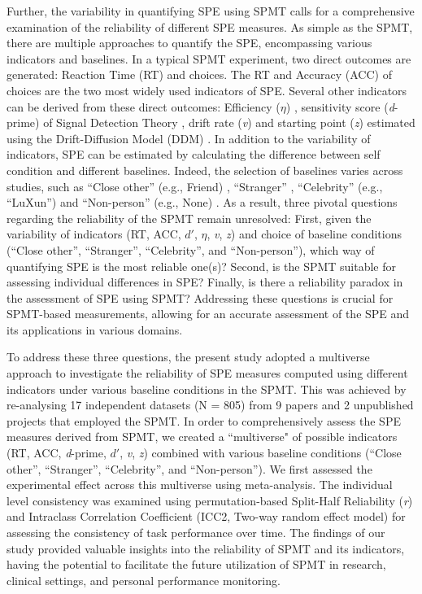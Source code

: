 \documentclass[sn-apa]{sn-jnl}%
\theoremstyle{thmstyleone}%
\theoremstyle{thmstyletwo}%
\theoremstyle{thmstylethree}%
\begin{document}
Further, the variability in quantifying SPE using SPMT calls for a comprehensive examination of the reliability of different SPE measures. As simple as the SPMT, there are multiple approaches to quantify the SPE, encompassing various indicators and baselines. In a typical SPMT experiment, two direct outcomes are generated: Reaction Time (RT) and choices. The RT and Accuracy (ACC) of choices are the two most widely used indicators of SPE. Several other indicators can be derived from these direct outcomes:  Efficiency ($\eta$) \parencite{humphreys2015the,stoeber2008perfectionism}, sensitivity score (\textit{d}-prime) of Signal Detection Theory \parencite{hu2020good,sui2012perceptual}, drift rate (\textit{v}) and starting point (\textit{z}) estimated using the Drift-Diffusion Model (DDM) \parencite{macrae2017self,reuther2017does}.  In addition to the variability of indicators, SPE can be estimated by calculating the difference between self condition and different baselines. Indeed, the selection of baselines varies across studies, such as ``Close other” (e.g., Friend) \parencite{navon2021are, svensson2022more}, ``Stranger” \parencite{constable2021affective, orellana2020does}, “Celebrity” (e.g., ``LuXun”) \parencite{qian2020prioritised} and ``Non-person” (e.g., None) \parencite{schafer2019understanding}. As a result, three pivotal questions regarding the reliability of the SPMT remain unresolved: First, given the variability of indicators (RT, ACC, $d'$, $\eta$, \textit{v}, \textit{z}) and choice of baseline conditions (``Close other”, ``Stranger”, ``Celebrity”, and ``Non-person”), which way of quantifying SPE is the most reliable one(s)? Second, is the SPMT suitable for assessing individual differences in SPE? Finally, is there a reliability paradox in the assessment of SPE using SPMT? Addressing these questions is crucial for SPMT-based measurements, allowing for an accurate assessment of the SPE and its applications in various domains. 

To address these three questions, the present study adopted a multiverse approach to investigate the reliability of SPE measures computed using different indicators under various baseline conditions in the SPMT. This was achieved by re-analysing 17 independent datasets (N = 805) from 9 papers and 2 unpublished projects that employed the SPMT. In order to comprehensively assess the SPE measures derived from SPMT, we created a ``multiverse" of possible indicators (RT, ACC, \textit{d}-prime, $d'$, \textit{v}, \textit{z}) combined with various baseline conditions (``Close other”, ``Stranger”, ``Celebrity”, and ``Non-person”). We first assessed the experimental effect across this multiverse using meta-analysis. The individual level consistency was examined using permutation-based Split-Half Reliability (\textit{r}) and Intraclass Correlation Coefficient (ICC2, Two-way random effect model) for assessing the consistency of task performance over time. The findings of our study provided valuable insights into the reliability of SPMT and its indicators, having the potential to facilitate the future utilization of SPMT in research, clinical settings, and personal performance monitoring.
\end{document}
